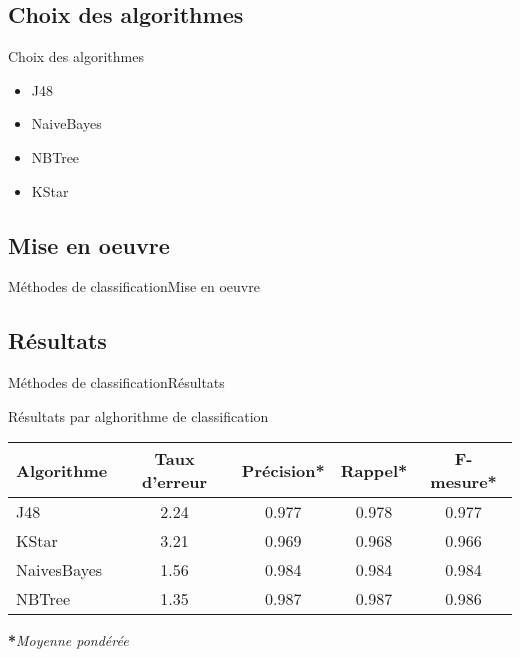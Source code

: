 \subsection{Choix des algorithmes}
\begin{frame}
  \begin{block}{Choix des algorithmes}
    \begin{itemize}
    \item J48
    \item NaiveBayes
    \item NBTree
    \item KStar
    \end{itemize}
  \end{block}
\end{frame}

\subsection{Mise en oeuvre}
\begin{frame}{Méthodes de classification}{Mise en oeuvre}
  
\end{frame}

\subsection{Résultats}
\begin{frame}{Méthodes de classification}{Résultats}

  Résultats par alghorithme de classification

  \begin{center}
    \scriptsize
    \begin{tabular}{l cccc} 
      \hline
      \textbf{Algorithme} & \textbf{Taux d'erreur} & \textbf{Précision*} & \textbf{Rappel*} & \textbf{F-mesure*}\\
      \hline
      J48 & 2.24 & 0.977 & 0.978 & 0.977\\
      KStar & 3.21 & 0.969 & 0.968 & 0.966\\
      NaivesBayes & 1.56 & 0.984 & 0.984 & 0.984\\
      NBTree & 1.35 & 0.987 & 0.987 & 0.986\\
    \end{tabular}
  \end{center}    
    \scriptsize\textbf{*}\textit{Moyenne pondérée}

\end{frame}


